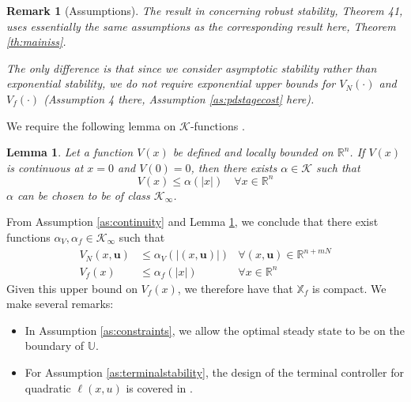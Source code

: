 \documentclass{article}
\newtheorem{lemma}{Lemma}
\newtheorem{remark}{Remark}
\newcommand{\abs}[1]{\left\lvert #1 \right\rvert}
\begin{document}
\begin{remark}[Assumptions]
\label{rm:assumptions}
The result in \cite{pannocchia:rawlings:wright:2011} concerning robust stability, Theorem 41,
uses essentially the same assumptions as the corresponding result here, Theorem \ref{th:mainiss}.

The only difference is that since we consider asymptotic
stability rather than exponential stability, we do not require exponential upper bounds for 
$V_N(\cdot)$ and $V_f(\cdot)$ (Assumption 4 there, Assumption \ref{as:pdstagecost} here).
\end{remark}
We require the following lemma on $\mathcal{K}$-functions \citep[Proposition 1]{rawlings:mayne:2011}. %
\begin{lemma}
\label{lem:overbound}
Let a function $V(x)$ be defined and locally bounded on $\mathbb{R}^n$. If 
$V(x)$ is continuous at $x=0$ and $V(0) = 0$, then there exists $\alpha \in \mathcal{K}$ such that
\begin{equation*}
V(x) \leq \alpha(\abs{x})  \quad \forall x \in \mathbb{R}^n
\end{equation*}
$\alpha$ can be chosen to be of class $\mathcal{K}_\infty$.
\end{lemma}
From Assumption \ref{as:continuity} and Lemma \ref{lem:overbound}, we 
conclude that there exist functions $\alpha_V,\alpha_f \in \mathcal{K}_\infty$
such that
\begin{align}
\label{eq:vnbound}
V_N(x,\mathbf{u}) &\leq \alpha_V(\abs{(x,\mathbf{u})}) &\forall (x,\mathbf{u}) \in \mathbb{R}^{n+mN} \\
\label{eq:vfbound}
V_f(x) &\leq \alpha_f(\abs{x}) &\forall x \in \mathbb{R}^n
\end{align}
Given this upper bound on $V_f(x)$, we therefore have that $\mathbb{X}_f$ is compact.
We make several remarks:
\begin{itemize}
\item In Assumption \ref{as:constraints}, we allow the optimal steady state
to be on the boundary of $\mathbb{U}$.
\item For Assumption \ref{as:terminalstability}, the design of the terminal
controller for quadratic $\ell(x,u)$ is covered in \citep[p. 136-138]{rawlings:mayne:2009}. 
\end{itemize}
\end{document}

